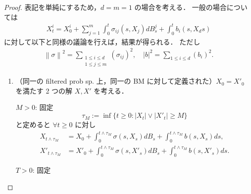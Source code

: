 \documentclass{jsarticle}
\begin{document}
\begin{proof}
    表記を単純にするため，$d=m=1$ の場合を考える．
    一般の場合については
    \begin{align}
        X_t^i
        = X_0^i
        + \sum_{j=1}^{m}\int_0^t \sigma_{ij}(s, X_j)dB_s^j
        + \int_0^t b_i(s, X_ds)
    \end{align}
    に対して以下と同様の議論を行えば，結果が得られる．
    ただし
    \begin{align}
        \left\lVert \sigma\right\rVert^2
        = \sum_{\substack{1\le i\le d \\ 1\le j\le m}}(\sigma_{ij})^2,\quad
        \left\lvert b\right\rvert^2
        = \sum_{1\le i\le d}(b_i)^2.
    \end{align}
    \begin{enumerate}[label=(\roman*)]
        \item
        （同一の filtered prob sp. 上，同一の BM に対して定義された）$X_0=X'_0$ を満たす 2 つの解 $X, X'$ を考える．
        
        $M>0$: 固定
        $$
        \tau_M:=\inf\{t\ge0:\left\lvert X_t\right\rvert\vee\left\lvert X'_t\right\rvert\ge M\}
        $$
        と定めると $\forall t\ge0$ に対し
        \begin{align}
            X_{t\wedge\tau_M}
            &= X_0
            + \int_0^{t\wedge\tau_M}\sigma(s, X_s)dB_s
            + \int_0^{t\wedge\tau_M}b(s, X_s)ds, \\
            X'_{t\wedge\tau_M}
            &= X'_0
            + \int_0^{t\wedge\tau_M}\sigma(s, X'_s)dB_s
            + \int_0^{t\wedge\tau_M}b(s, X'_s)ds.
        \end{align}

        $T>0$: 固定


\end{enumerate}
\end{proof}
\end{document}
